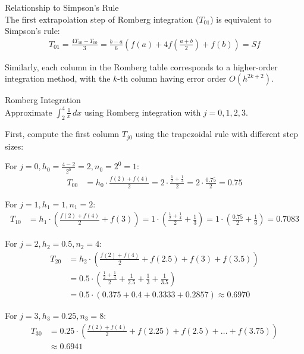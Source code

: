 \begin{theorem}{Relationship to Simpson's Rule}\\
The first extrapolation step of Romberg integration ($T_{01}$) is equivalent to Simpson's rule:
\begin{align*}
T_{01} = \frac{4T_{10} - T_{00}}{3} = \frac{b-a}{6}(f(a) + 4f(\frac{a+b}{2}) + f(b)) = Sf
\end{align*}

Similarly, each column in the Romberg table corresponds to a higher-order integration method, with the $k$-th column having error order $O(h^{2k+2})$.
\end{theorem}

\begin{example2}{Romberg Integration}\\
Approximate $\int_2^4 \frac{1}{x} \, dx$ using Romberg integration with $j = 0, 1, 2, 3$.

First, compute the first column $T_{j0}$ using the trapezoidal rule with different step sizes:

For $j = 0, h_0 = \frac{4-2}{2^0} = 2, n_0 = 2^0 = 1$:
\begin{align*}
T_{00} &= h_0 \cdot \frac{f(2) + f(4)}{2} = 2 \cdot \frac{\frac{1}{2} + \frac{1}{4}}{2} = 2 \cdot \frac{0.75}{2} = 0.75
\end{align*}

For $j = 1, h_1 = 1, n_1 = 2$:
\begin{align*}
T_{10} &= h_1 \cdot \left(\frac{f(2) + f(4)}{2} + f(3)\right) = 1 \cdot \left(\frac{\frac{1}{2} + \frac{1}{4}}{2} + \frac{1}{3}\right) = 1 \cdot \left(\frac{0.75}{2} + \frac{1}{3}\right) = 0.7083
\end{align*}

For $j = 2, h_2 = 0.5, n_2 = 4$:
\begin{align*}
T_{20} &= h_2 \cdot \left(\frac{f(2) + f(4)}{2} + f(2.5) + f(3) + f(3.5)\right)\\
&= 0.5 \cdot \left(\frac{\frac{1}{2} + \frac{1}{4}}{2} + \frac{1}{2.5} + \frac{1}{3} + \frac{1}{3.5}\right)\\
&= 0.5 \cdot (0.375 + 0.4 + 0.3333 + 0.2857) \approx 0.6970
\end{align*}

For $j = 3, h_3 = 0.25, n_3 = 8$:
\begin{align*}
T_{30} &= 0.25 \cdot \left(\frac{f(2) + f(4)}{2} + f(2.25) + f(2.5) + \ldots + f(3.75)\right)\\
&\approx 0.6941
\end{align*}


\end{example2}
